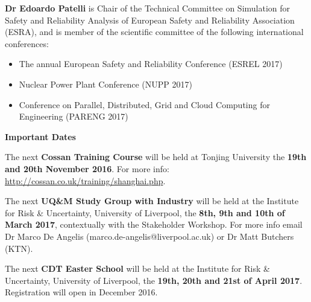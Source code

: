 \documentclass[11pt]{article}%
\begin{document}
\begin{minipage}[t]{0.99\textwidth}
{\bf Dr Edoardo Patelli} is Chair of the Technical Committee on Simulation for Safety and Reliability Analysis of European Safety and Reliability Association (ESRA), and is member of the scientific committee of the following international conferences:
    \begin{itemize}
        \item The annual European Safety and Reliability Conference (ESREL 2017)
        \vspace{5pt}
        \item Nuclear Power Plant Conference (NUPP 2017)
        \vspace{5pt}
        \item Conference on Parallel, Distributed, Grid and Cloud Computing for Engineering (PARENG 2017) 
    \end{itemize}


\vspace{5pt}    
{\Large{\bf Important Dates}}

The next {\bf Cossan Training Course} will be held at Tonjing University the {\bf 19th and 20th November 2016}. For more info: \href{http://cossan.co.uk/training/shanghai.php}{http://cossan.co.uk/training/shanghai.php}.

The next {\bf UQ\&M Study Group with Industry} will be held at the Institute for Risk \& Uncertainty, University of Liverpool, the {\bf 8th, 9th and 10th of March 2017}, contextually with the Stakeholder Workshop. For more info email Dr Marco De Angelis (marco.de-angelis@liverpool.ac.uk) or Dr Matt Butchers (KTN).

The next {\bf CDT Easter School} will be held at the Institute for Risk \& Uncertainty, University of Liverpool, the {\bf 19th, 20th and 21st of April 2017}. Registration will open in December 2016.

\end{minipage}















\cleardoublepage

\pagecolor{covercolor}\afterpage{\nopagecolor}

\thispagestyle{Projects}

\begin{minipage}[t]{0.99\textwidth}
\hypertarget{Projects}{}
\end{minipage}
\end{document}
